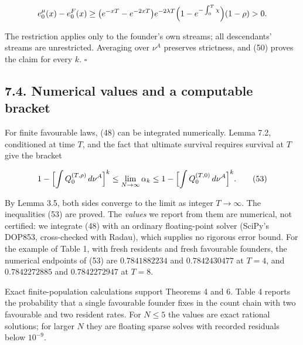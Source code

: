 \documentclass[
  british,
  11pt,
  a4paper,
]{article}
\begin{document}
\[
e^\mu_0(x)-e^F_0(x)\ge\bigl(e^{-xT}-e^{-2xT}\bigr)e^{-2\lambda T}\Bigl(1-e^{-\int_0^T\chi}\Bigr)(1-\rho)>0.
\]

The restriction applies only to the founder's own streams; all
descendants' streams are unrestricted. Averaging over \(\nu^A\)
preserves strictness, and (50) proves the claim for every \(k\).
\(\square\)

\subsection{7.4. Numerical values and a computable
bracket}\label{numerical-values-and-a-computable-bracket}

For finite favourable laws, (48) can be integrated numerically. Lemma
7.2, conditioned at time \(T\), and the fact that ultimate survival
requires survival at \(T\) give the bracket

\[
1-\Bigl[\int Q^{(T,\rho)}_0\,d\nu^A\Bigr]^k
\le\lim_{N\to\infty}\alpha_k
\le1-\Bigl[\int Q^{(T,0)}_0\,d\nu^A\Bigr]^k.
\tag{53}
\]

By Lemma 3.5, both sides converge to the limit as integer
\(T\to\infty\). The inequalities (53) are proved. The \emph{values} we
report from them are numerical, not certified: we integrate (48) with an
ordinary floating-point solver (SciPy's DOP853, cross-checked with
Radau), which supplies no rigorous error bound. For the example of Table
1, with fresh residents and fresh favourable founders, the numerical
endpoints of (53) are \(0.7841882234\) and \(0.7842430477\) at \(T=4\),
and \(0.7842272885\) and \(0.7842272947\) at \(T=8\).

Exact finite-population calculations support Theorems 4 and 6. Table 4
reports the probability that a single favourable founder fixes in the
count chain with two favourable and two resident rates. For \(N\le5\)
the values are exact rational solutions; for larger \(N\) they are
floating sparse solves with recorded residuals below \(10^{-9}\).
\end{document}
